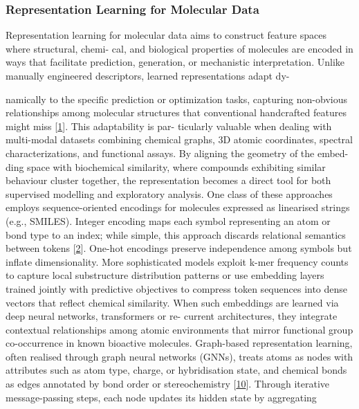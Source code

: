 \documentclass[
]{article}
\begin{document}
\hypertarget{representation-learning-for-molecular-data}{%
\subsubsection{Representation Learning for Molecular
Data}\label{representation-learning-for-molecular-data}}

Representation learning for molecular data aims to construct feature
spaces where structural, chemi- cal, and biological properties of
molecules are encoded in ways that facilitate prediction, generation, or
mechanistic interpretation. Unlike manually engineered descriptors,
learned representations adapt dy-

namically to the specific prediction or optimization tasks, capturing
non-obvious relationships among molecular structures that conventional
handcrafted features might miss
{[}\protect\hyperlink{_bookmark41}{1}{]}. This adaptability is par-
ticularly valuable when dealing with multi-modal datasets combining
chemical graphs, 3D atomic coordinates, spectral characterizations, and
functional assays. By aligning the geometry of the embed- ding space
with biochemical similarity, where compounds exhibiting similar
behaviour cluster together, the representation becomes a direct tool for
both supervised modelling and exploratory analysis. One class of these
approaches employs sequence-oriented encodings for molecules expressed
as linearised strings (e.g., SMILES). Integer encoding maps each symbol
representing an atom or bond type to an index; while simple, this
approach discards relational semantics between tokens
{[}\protect\hyperlink{_bookmark42}{2}{]}. One-hot encodings preserve
independence among symbols but inflate dimensionality. More
sophisticated models exploit k-mer frequency counts to capture local
substructure distribution patterns or use embedding layers trained
jointly with predictive objectives to compress token sequences into
dense vectors that reflect chemical similarity. When such embeddings are
learned via deep neural networks, transformers or re- current
architectures, they integrate contextual relationships among atomic
environments that mirror functional group co-occurrence in known
bioactive molecules. Graph-based representation learning, often realised
through graph neural networks (GNNs), treats atoms as nodes with
attributes such as atom type, charge, or hybridisation state, and
chemical bonds as edges annotated by bond order or stereochemistry
{[}\protect\hyperlink{_bookmark50}{10}{]}. Through iterative
message-passing steps, each node updates its hidden state by aggregating
\end{document}
